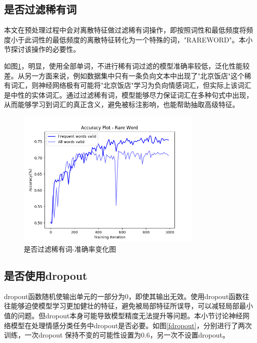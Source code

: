\subsection{是否过滤稀有词} \label{sec:rareword}
本文在预处理过程中会对离散特征做过滤稀有词操作，即按照词性和最低频度将频度小于此词性的最低频度的离散特征转化为一个特殊的词，"RAREWORD"。本小节探讨该操作的必要性。


如图\ref{frareword}，明显，使用全部单词，不进行稀有词过滤的模型准确率较低，泛化性能较差。从另一方面来说，例如数据集中只有一条负向文本中出现了"北京饭店"这个稀有词汇，则神经网络极有可能将"北京饭店"学习为负向情感词汇，但实际上该词汇是中性的实体词汇。通过过滤稀有词，模型能够尽力保证词汇在多种句式中出现，从而能够学习到词汇的真正含义，避免被标注影响，也能帮助抽取高级特征。
\begin{center}
\begin{figure}[!hbp]
\includegraphics[width=0.8\textwidth]{graphic/rareword.png}
\caption{是否过滤稀有词-准确率变化图 \label{frareword}}
\end{figure}
\end{center}
\subsection{是否使用dropout}
dropout函数随机使输出单元的一部分为0，即使其输出无效。使用dropout函数往往能够迫使模型学习更加健壮的特征，避免被局部特征所误导，可以减轻局部最小值的问题。但dropout本身可能导致模型精度无法提升等问题。本小节讨论神经网络模型在处理情感分类任务中dropout是否必要。如图\ref{fdropout}，分别进行了两次训练，一次dropout 保持不变的可能性设置为0.6，另一次不设置dropout。



